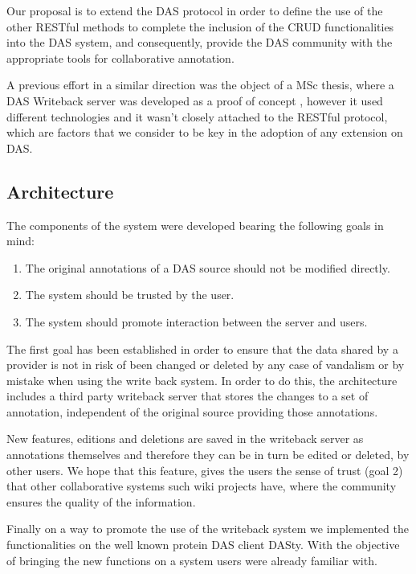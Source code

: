 Our proposal is to extend the DAS protocol in order to define the use of the other RESTful methods to complete the inclusion of the CRUD functionalities into the DAS system, and consequently, provide the DAS community with the appropriate tools for collaborative annotation.

A previous effort in a similar direction was the object of a MSc thesis, where a DAS Writeback server was developed as a proof of concept \cite{GRZ2008}, however it used different technologies and it wasn't closely attached to the RESTful protocol, which are factors that we consider to be key in the adoption of any extension on DAS.

\subsection{Architecture}
The components of the system were developed bearing the following goals in mind:
\begin{enumerate}
\setlength\itemsep{-0.5em}
\item The original annotations of a DAS source should not be modified directly.
\item The system should be trusted by the user.
\item The system should promote interaction between the server and users.
\end{enumerate}

The first goal has been established in order to ensure that the data shared by a provider is not in risk of been changed or deleted by any case of vandalism or by mistake when using the write back system. In order to do this, the architecture includes a third party writeback server that stores the changes to a set of annotation, independent of the original source providing those annotations. 

New features, editions and deletions are saved in the writeback server as annotations themselves and therefore they can be in turn be edited or deleted, by other users. We hope that this feature, gives the users the sense of trust (goal 2) that other collaborative systems such wiki projects have, where the community ensures the quality of the information. 

Finally on a way to promote the use of the writeback system we implemented the functionalities on the well known protein DAS client DASty. With the objective of bringing the new functions on a system users were already familiar with.

